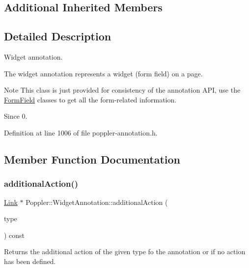 \subsection*{Additional Inherited Members}


\subsection{Detailed Description}
Widget annotation. 

The widget annotation represents a widget (form field) on a page.

\begin{DoxyNote}{Note}
This class is just provided for consistency of the annotation A\+PI, use the \hyperlink{class_poppler_1_1_form_field}{Form\+Field} classes to get all the form-\/related information.
\end{DoxyNote}
\begin{DoxySince}{Since}
0. 
\end{DoxySince}


Definition at line 1006 of file poppler-\/annotation.\+h.



\subsection{Member Function Documentation}
\mbox{\label{class_poppler_1_1_widget_annotation_aa0c058e4a88b0abf9d717fe7f688a548}} 
\subsubsection{\texorpdfstring{additional\+Action()}{additionalAction()}}
{\footnotesize\ttfamily \hyperlink{class_poppler_1_1_link}{Link} $\ast$ Poppler\+::\+Widget\+Annotation\+::additional\+Action (\begin{DoxyParamCaption}\item[{\hyperlink{class_poppler_1_1_annotation_adab1fa85588b8f9fcdf20cdf37c1be97}{Additional\+Action\+Type}}]{type }\end{DoxyParamCaption}) const}

Returns the additional action of the given {\ttfamily type} fo the annotation or {} if no action has been defined.


